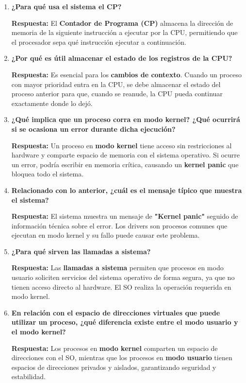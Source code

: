 \documentclass[a4paper,12pt]{article}
\begin{document}
\begin{enumerate}[label=\textbf{Pregunta \arabic*.},left=0pt,itemsep=1.5em]
\item \textbf{¿Para qué usa el sistema el CP?}

\textbf{Respuesta:} El \textbf{Contador de Programa (CP)} almacena la dirección de memoria de la siguiente instrucción a ejecutar por la CPU, permitiendo que el procesador sepa qué instrucción ejecutar a continuación.

\item \textbf{¿Por qué es útil almacenar el estado de los registros de la CPU?}

\textbf{Respuesta:} Es esencial para los \textbf{cambios de contexto}. Cuando un proceso con mayor prioridad entra en la CPU, se debe almacenar el estado del proceso anterior para que, cuando se reanude, la CPU pueda continuar exactamente donde lo dejó.

\item \textbf{¿Qué implica que un proceso corra en modo kernel? ¿Qué ocurrirá si se ocasiona un error durante dicha ejecución?}

\textbf{Respuesta:} Un proceso en \textbf{modo kernel} tiene acceso sin restricciones al hardware y comparte espacio de memoria con el sistema operativo. Si ocurre un error, podría escribir en memoria crítica, causando un \textbf{kernel panic} que bloquea todo el sistema.

\item \textbf{Relacionado con lo anterior, ¿cuál es el mensaje típico que muestra el sistema?}

\textbf{Respuesta:} El sistema muestra un mensaje de \textbf{"Kernel panic"} seguido de información técnica sobre el error. Los drivers son procesos comunes que ejecutan en modo kernel y su fallo puede causar este problema.

\item \textbf{¿Para qué sirven las llamadas a sistema?}

\textbf{Respuesta:} Las \textbf{llamadas a sistema} permiten que procesos en modo usuario soliciten servicios del sistema operativo de forma segura, ya que no tienen acceso directo al hardware. El SO realiza la operación requerida en modo kernel.

\item \textbf{En relación con el espacio de direcciones virtuales que puede utilizar un proceso, ¿qué diferencia existe entre el modo usuario y el modo kernel?}

\textbf{Respuesta:} Los procesos en \textbf{modo kernel} comparten un espacio de direcciones con el SO, mientras que los procesos en \textbf{modo usuario} tienen espacios de direcciones privados y aislados, garantizando seguridad y estabilidad.


\end{enumerate}
\end{document}

